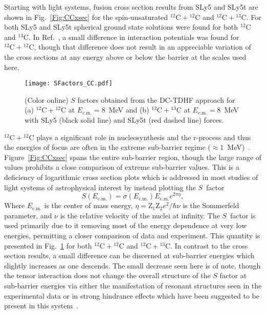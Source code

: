 \documentclass[aps,prc,twocolumn,showpacs,superscriptaddress,longbibliography,floatfix,10pt]{revtex4-1}
\begin{document}
Starting with light systems, fusion cross section results from SLy5 and SLy5t are shown in Fig.~\ref{Fig:CCxsec} for the spin-unsaturated $^{12}\mathrm{C}+\mathrm{^{12}C}$ and $^{12}\mathrm{C}+\mathrm{^{13}C}$.
For both SLy5 and SLy5t spherical ground state solutions were found for both $^{12}\mathrm{C}$ and $^{13}\mathrm{C}$.
In Ref.~\cite{guo2018b}, a small difference in interaction potentials was found for $^{12}\mathrm{C}+\mathrm{^{12}C}$, though that difference does not result in an appreciable variation of the cross sections at any energy above or below the barrier at the scales used here.

\begin{figure}
	\texttt{[image: SFactors\_CC.pdf]}
	\caption{(Color online) $S$ factors obtained from the DC-TDHF approach for (a) $^{12}\mathrm{C}+\mathrm{^{12}C}$ at $E_{\mathrm{c.m.}}=8$~MeV and (b) $^{12}\mathrm{C}+\mathrm{^{13}C}$ at $E_{\mathrm{c.m.}}=8$~MeV with SLy5 (black solid line) and SLy5t (red dashed line) forces.
		\label{Fig:CCsfac}}
\end{figure}

$^{12}\mathrm{C}+\mathrm{^{12}C}$ plays a significant role in nucleosynthesis and the r-process and thus the energies of focus are often in the extreme sub-barrier regime ($\approx 1$~MeV)~\cite{cumming2001,strohmayer2002,hoyle1954,godbey2019b}.
Figure~\ref{Fig:CCxsec} spans the entire sub-barrier region, though the large range of values prohibits a close comparison of extreme sub-barrier values.
This is a deficiency of logarithmic cross section plots which is addressed in most studies of light systems of astrophysical interest by instead plotting the $S$~factor
\begin{equation}
S(E_{\mathrm{c.m.}})=\sigma(E_{\mathrm{c.m.}})E_{\mathrm{c.m.}}e^{2\pi\eta},
\end{equation}
Where $E_{\mathrm{c.m.}}$ is the center of mass energy, $\eta=\mathrm{Z_1}\mathrm{Z_2}e^2/\hbar\nu$ is the Sommerfeld parameter, and $\nu$ is the relative velocity of the nuclei at infinity.
The $S$~factor is used primarily due to it removing most of the energy dependence at very low energies, permitting a closer comparison of data and experiment.
This quantity is presented in Fig.~\ref{Fig:CCsfac} for both $^{12}\mathrm{C}+\mathrm{^{12}C}$ and $^{12}\mathrm{C}+\mathrm{^{13}C}$.
In contrast to the cross section results, a small difference can be discerned at sub-barrier energies which slightly increases as one descends.
The small decrease seen here is of note, though the tensor interaction does not change the overall structure of the $S$ factor at sub-barrier energies via either the manifestation of resonant structures seen in the experimental data or in strong hindrance effects which have been suggested to be present in this system~\cite{jiang2007}.
\end{document}
